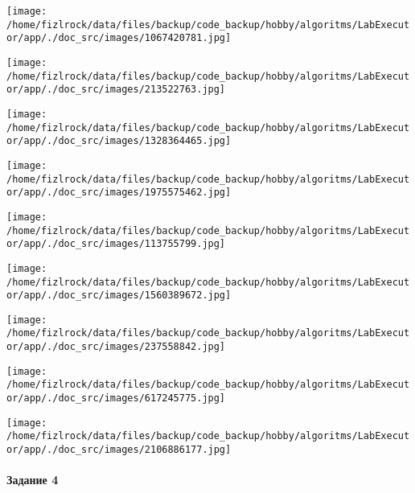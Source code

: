\documentclass[a4paper, 12pt]{article}
\begin{document}
\texttt{[image: /home/fizlrock/data/files/backup/code\_backup/hobby/algoritms/LabExecutor/app/./doc\_src/images/1067420781.jpg]}

\texttt{[image: /home/fizlrock/data/files/backup/code\_backup/hobby/algoritms/LabExecutor/app/./doc\_src/images/213522763.jpg]}

\texttt{[image: /home/fizlrock/data/files/backup/code\_backup/hobby/algoritms/LabExecutor/app/./doc\_src/images/1328364465.jpg]}

\texttt{[image: /home/fizlrock/data/files/backup/code\_backup/hobby/algoritms/LabExecutor/app/./doc\_src/images/1975575462.jpg]}

\texttt{[image: /home/fizlrock/data/files/backup/code\_backup/hobby/algoritms/LabExecutor/app/./doc\_src/images/113755799.jpg]}

\texttt{[image: /home/fizlrock/data/files/backup/code\_backup/hobby/algoritms/LabExecutor/app/./doc\_src/images/1560389672.jpg]}

\texttt{[image: /home/fizlrock/data/files/backup/code\_backup/hobby/algoritms/LabExecutor/app/./doc\_src/images/237558842.jpg]}

\texttt{[image: /home/fizlrock/data/files/backup/code\_backup/hobby/algoritms/LabExecutor/app/./doc\_src/images/617245775.jpg]}

\texttt{[image: /home/fizlrock/data/files/backup/code\_backup/hobby/algoritms/LabExecutor/app/./doc\_src/images/2106886177.jpg]}
\pagebreak
\paragraph{Задание 4}
\end{document}
